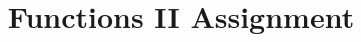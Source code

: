 \documentclass[12pt,a4paper]{exam}
\title{\vspace{-4em}Functions II Assignment}
\date{\vspace{-3em}}
\begin{document}
    \maketitle
      \begin{questions}

        
      \end{questions}
\end{document}
